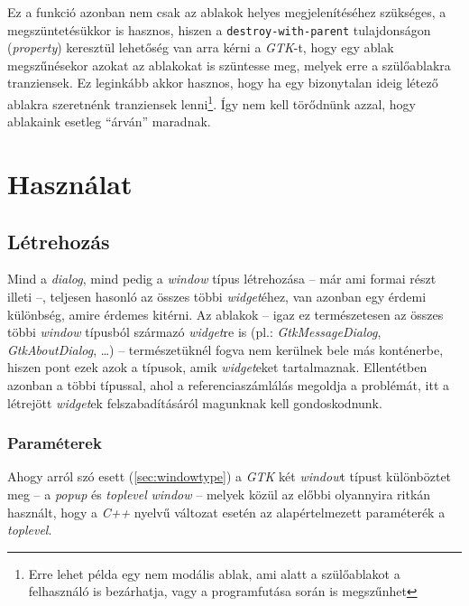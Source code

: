 Ez a funkció azonban nem csak az ablakok helyes megjelenítéséhez szükséges, a megszüntetésükkor is hasznos, hiszen a \texttt{destroy-with-parent} tulajdonságon (\textit{property}) keresztül lehetőség van arra kérni a \textit{GTK}-t, hogy egy ablak megszűnésekor azokat az ablakokat is szüntesse meg, melyek erre a szülőablakra tranziensek. Ez leginkább akkor hasznos, hogy ha egy bizonytalan ideig létező ablakra szeretnénk tranziensek lenni\footnote{Erre lehet példa egy nem modális ablak, ami alatt a szülőablakot a felhasználó is bezárhatja, vagy a programfutása során is megszűnhet}. Így nem kell törődnünk azzal, hogy ablakaink esetleg ``árván'' maradnak.\label{par:windowdestroywithparent}

\section{Használat}

\subsection{Létrehozás}

Mind a \textit{dialog}, mind pedig a \textit{window} típus létrehozása -- már ami formai részt illeti --, teljesen hasonló az összes többi \textit{widget}éhez, van azonban egy érdemi különbség, amire érdemes kitérni. Az ablakok -- igaz ez természetesen az összes többi \textit{window} típusból származó \textit{widget}re is (pl.: \textit{GtkMessageDialog}, \textit{GtkAboutDialog}, \dots) -- természetüknél fogva nem kerülnek bele más konténerbe, hiszen pont ezek azok a típusok, amik \textit{widget}eket tartalmaznak. Ellentétben azonban a többi típussal, ahol a referenciaszámlálás megoldja a problémát, itt a létrejött \textit{widget}ek felszabadításáról magunknak kell gondoskodnunk.

\subsubsection{Paraméterek}

Ahogy arról szó esett (\ref{sec:windowtype}) a \textit{GTK} két \textit{window}t típust különböztet meg -- a \textit{popup} és \textit{toplevel} \textit{window} -- melyek közül az előbbi olyannyira ritkán használt, hogy a \textit{C++} nyelvű változat esetén az alapértelmezett paraméterék a \textit{toplevel}.

